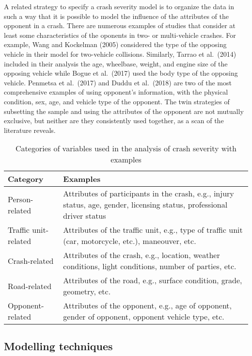 \documentclass[]{elsarticle} %
\begin{document}
A related strategy to specify a crash severity model is to organize the
data in such a way that it is possible to model the influence of the
attributes of the opponent in a crash. There are numerous examples of
studies that consider at least some characteristics of the oponents in
two- or multi-vehicle crashes. For example, Wang and Kockelman (2005)
considered the type of the opposing vehicle in their model for
two-vehicle collisions. Similarly, Tarrao et al.~(2014) included in
their analysis the age, wheelbase, weight, and engine size of the
opposing vehicle while Bogue et al.~(2017) used the body type of the
opposing vehicle. Penmetsa et al.~(2017) and Duddu et al.~(2018) are two
of the most comprehensive examples of using opponent's information, with
the physical condition, sex, age, and vehicle type of the opponent. The
twin strategies of subsetting the sample and using the attributes of the
opponent are not mutually exclusive, but neither are they consistently
used together, as a scan of the literature reveals.

\begin{table}

\caption{\label{tab:table-variable-categories}\label{tab:variable-categories}Categories of variables used in the analysis of crash severity with examples}
\centering
\fontsize{7}{9}\selectfont
\begin{tabular}[t]{l>{\raggedright\arraybackslash}p{22em}}
\toprule
Category & Examples\\
\midrule
Person-related & Attributes of participants in the crash, e.g., injury status, age, gender, licensing status, professional driver status\\
Traffic unit-related & Attributes of the traffic unit, e.g., type of traffic unit (car, motorcycle, etc.), maneouver, etc.\\
Crash-related & Attributes of the crash, e.g., location, weather conditions, light conditions, number of parties, etc.\\
Road-related & Attributes of the road, e.g., surface condition, grade, geometry, etc.\\
Opponent-related & Attributes of the opponent, e.g., age of opponent, gender of opponent, opponent vehicle type, etc.\\
\bottomrule
\end{tabular}
\end{table}

\hypertarget{modelling-techniques}{%
\subsection{Modelling techniques}\label{modelling-techniques}}
\end{document}
